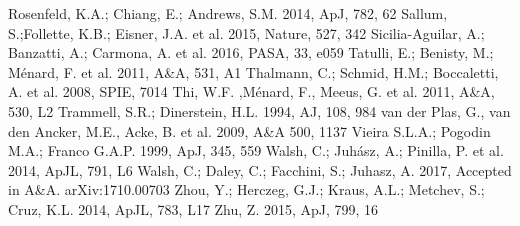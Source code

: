 \documentclass{aa}
\begin{document}
\begin{thebibliography}{}
 Rosenfeld, K.A.; Chiang, E.; Andrews, S.M. 2014, ApJ, 782, 62
 Sallum, S.;Follette, K.B.; Eisner, J.A. et al. 2015, Nature, 527, 342
 Sicilia-Aguilar, A.; Banzatti, A.; Carmona, A. et al. 2016, PASA, 33, e059
 Tatulli, E.; Benisty, M.; M\'enard, F. et al. 2011, A\&A, 531, A1
 Thalmann, C.; Schmid, H.M.; Boccaletti, A. et al. 2008, SPIE, 7014
  Thi, W.F. ,M\'enard, F., Meeus, G. et al. 2011, A\&A, 530, L2
 Trammell, S.R.; Dinerstein, H.L. 1994, AJ, 108, 984
 van der Plas, G., van den Ancker, M.E., Acke, B. et al. 2009, A\&A 500, 1137
 Vieira S.L.A.; Pogodin M.A.; Franco G.A.P. 1999, ApJ, 345, 559
 Walsh, C.; Juh\'asz, A.; Pinilla, P. et al. 2014, ApJL, 791, L6
 Walsh, C.; Daley, C.; Facchini, S.; Juhasz, A. 2017, Accepted in A\&A. arXiv:1710.00703
 Zhou, Y.; Herczeg, G.J.; Kraus, A.L.; Metchev, S.; Cruz, K.L. 2014, ApJL, 783, L17
 Zhu, Z. 2015, ApJ, 799, 16
\end{thebibliography}
\end{document}
